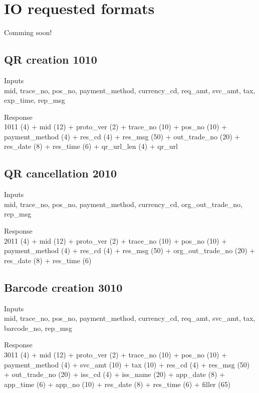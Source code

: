 \documentclass[12pt]{article}
\begin{document}
\section{IO requested formats }\label{results}
Comming soon!
\subsection{QR creation 1010}
    \begin{description}
        \item Inputs \\
            mid, trace\_no, pos\_no, payment\_method, currency\_cd, req\_amt, svc\_amt, tax, exp\_time, rep\_msg
        \item Response \\
        1011 (4) + mid (12) + proto\_ver (2) 
        + trace\_no (10) + pos\_no (10) + payment\_method (4) 
        + res\_cd (4) + res\_msg (50) + out\_trade\_no (20) 
        + res\_date (8) + res\_time (6) + qr\_url\_len (4) + qr\_url
    \end{description}

\subsection{QR cancellation 2010}
    \begin{description}
        \item Inputs \\
            mid, trace\_no, pos\_no, 
            payment\_method, currency\_cd, org\_out\_trade\_no, 
            rep\_msg \\
        \item Response \\
        2011 (4) + mid (12) + proto\_ver (2) 
        + trace\_no (10) + pos\_no (10) + payment\_method (4) 
        + res\_cd (4) + res\_msg (50) + org\_out\_trade\_no (20) 
        + res\_date (8) + res\_time (6)
    \end{description}

\subsection{Barcode creation 3010}
    \begin{description}
        \item Inputs \\
            mid, trace\_no, pos\_no, 
            payment\_method, currency\_cd, req\_amt, 
            svc\_amt, tax, barcode\_no, rep\_msg \\
        \item Response \\
        3011 (4) + mid (12) + proto\_ver (2) 
        + trace\_no (10) + pos\_no (10) + payment\_method (4) 
        + svc\_amt (10) + tax (10) + res\_cd (4)
        + res\_msg (50) + out\_trade\_no (20) + iss\_cd (4)
        + iss\_name (20) + app\_date (8) + app\_time (6) 
        + app\_no (10) + res\_date (8) + res\_time (6)
        + filler (65)
    \end{description}
\end{document}
